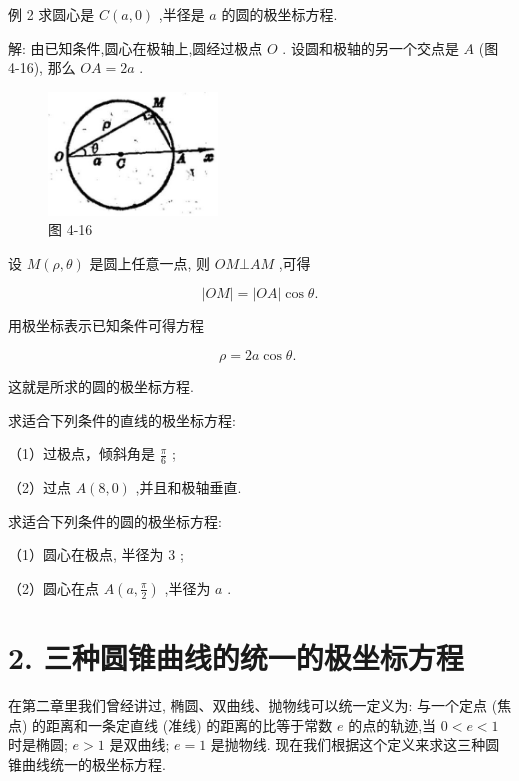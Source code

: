 \documentclass[lang=cn,newtx,10pt,scheme=chinese]{elegantbook}
\begin{document}
例 2 求圆心是 \(C\left( {a,0}\right)\) ,半径是 \(a\) 的圆的极坐标方程.

解: 由已知条件,圆心在极轴上,圆经过极点 \(O\) . 设圆和极轴的另一个交点是 \(A\) (图 4-16), 那么 \({OA} = {2a}\) .

\begin{figure}[h]
  \centering
  \includegraphics[max width=0.4\textwidth]{images/01912cc2-ffb6-728e-9ae7-b113ff05c64b_178_274440.jpg}
  \caption{图 4-16}
\end{figure}



设 \(M\left( {\rho ,\theta }\right)\) 是圆上任意一点, 则 \({OM} \bot {AM}\) ,可得

\[
  \left| {OM}\right| = \left| {OA}\right| \cos \theta \text{.}
\]

用极坐标表示已知条件可得方程

\[
  \rho = {2a}\cos \theta \text{. }
\]

这就是所求的圆的极坐标方程.

\begin{problemset}[练习]

\item 求适合下列条件的直线的极坐标方程:

（1）过极点，倾斜角是 \(\frac{\pi }{6}\) ;

（2）过点 \(A\left( {8,0}\right)\) ,并且和极轴垂直.

\item 求适合下列条件的圆的极坐标方程:

（1）圆心在极点, 半径为 3 ;

（2）圆心在点 \(A\left( {a,\frac{\pi }{2}}\right)\) ,半径为 \(a\) .

\end{problemset}

\section*{2. 三种圆锥曲线的统一的极坐标方程}

在第二章里我们曾经讲过, 椭圆、双曲线、抛物线可以统一定义为: 与一个定点 (焦点) 的距离和一条定直线 (准线) 的距离的比等于常数 \(e\) 的点的轨迹,当 \(0 < e < 1\) 时是椭圆; \(e > 1\) 是双曲线; \(e = 1\) 是抛物线. 现在我们根据这个定义来求这三种圆锥曲线统一的极坐标方程.
\end{document}
